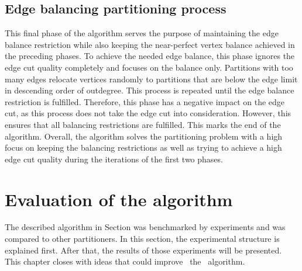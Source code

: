 \documentclass[acmsmall,nonacm,screen,review]{acmart}
\begin{document}
\subsection{Edge balancing partitioning process}
This final phase of the algorithm serves the purpose of maintaining the edge balance restriction while also keeping the near-perfect vertex balance achieved in the preceding phases. To achieve the needed edge balance, this phase ignores the edge cut quality completely and focuses on the balance only. Partitions with too many edges relocate vertices randomly to partitions that are below the edge limit in descending order of outdegree. This process is repeated until the edge balance restriction is fulfilled. Therefore, this phase has a negative impact on the edge cut, as this process does not take the edge cut into consideration. However, this ensures that all balancing restrictions are fulfilled. This marks the end of the algorithm. Overall, the algorithm solves the partitioning problem with a high focus on keeping the balancing restrictions as well as trying to achieve a high edge cut quality during the iterations of the first two phases.
\section{Evaluation of the algorithm}
The described algorithm in Section  was benchmarked by experiments and was compared to other partitioners. In this section, the experimental structure is explained first. After that, the results of those experiments will be presented. This chapter closes with ideas that could improve ~the ~algorithm.
\end{document}
